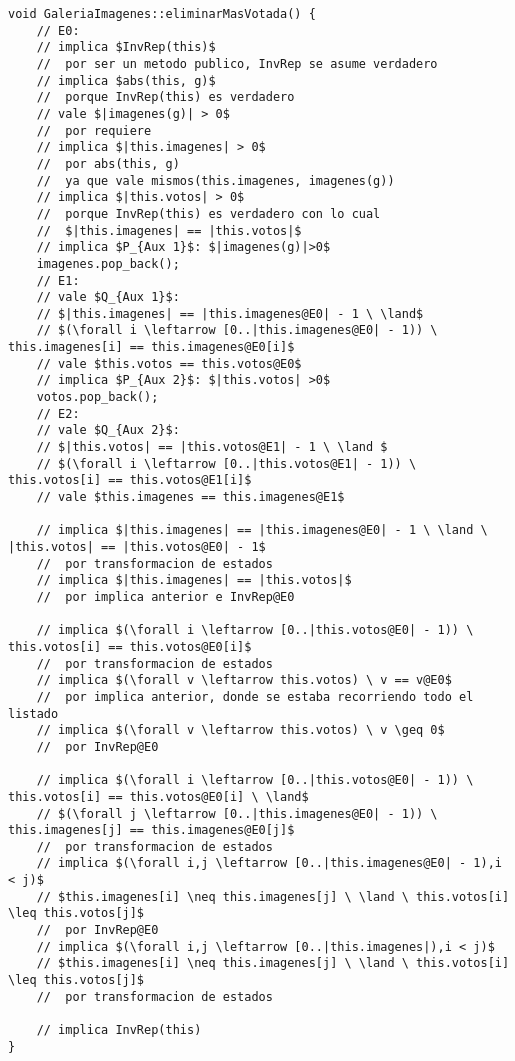 \documentclass[10pt,a4paper,spanish]{article}
\begin{document}
\begin{lstlisting}
void GaleriaImagenes::eliminarMasVotada() {
	// E0:
	// implica $InvRep(this)$
	// 	por ser un metodo publico, InvRep se asume verdadero
	// implica $abs(this, g)$
	// 	porque InvRep(this) es verdadero
	// vale $|imagenes(g)| > 0$
	// 	por requiere
	// implica $|this.imagenes| > 0$
	// 	por abs(this, g)
	//	ya que vale mismos(this.imagenes, imagenes(g))
	// implica $|this.votos| > 0$
	// 	porque InvRep(this) es verdadero con lo cual
	//	$|this.imagenes| == |this.votos|$
	// implica $P_{Aux 1}$: $|imagenes(g)|>0$
	imagenes.pop_back();
	// E1:
	// vale $Q_{Aux 1}$: 
	// $|this.imagenes| == |this.imagenes@E0| - 1 \ \land$
	// $(\forall i \leftarrow [0..|this.imagenes@E0| - 1)) \ this.imagenes[i] == this.imagenes@E0[i]$
	// vale $this.votos == this.votos@E0$
	// implica $P_{Aux 2}$: $|this.votos| >0$
	votos.pop_back();
	// E2:
	// vale $Q_{Aux 2}$: 
	// $|this.votos| == |this.votos@E1| - 1 \ \land $ 
	// $(\forall i \leftarrow [0..|this.votos@E1| - 1)) \ this.votos[i] == this.votos@E1[i]$
	// vale $this.imagenes == this.imagenes@E1$

	// implica $|this.imagenes| == |this.imagenes@E0| - 1 \ \land \ |this.votos| == |this.votos@E0| - 1$
	// 	por transformacion de estados
	// implica $|this.imagenes| == |this.votos|$
	//	por implica anterior e InvRep@E0

	// implica $(\forall i \leftarrow [0..|this.votos@E0| - 1)) \ this.votos[i] == this.votos@E0[i]$
	//	por transformacion de estados
	// implica $(\forall v \leftarrow this.votos) \ v == v@E0$
	//	por implica anterior, donde se estaba recorriendo todo el listado
	// implica $(\forall v \leftarrow this.votos) \ v \geq 0$
	//	por InvRep@E0

	// implica $(\forall i \leftarrow [0..|this.votos@E0| - 1)) \ this.votos[i] == this.votos@E0[i] \ \land$
	// $(\forall j \leftarrow [0..|this.imagenes@E0| - 1)) \ this.imagenes[j] == this.imagenes@E0[j]$
	// 	por transformacion de estados
	// implica $(\forall i,j \leftarrow [0..|this.imagenes@E0| - 1),i < j)$
	// $this.imagenes[i] \neq this.imagenes[j] \ \land \ this.votos[i] \leq this.votos[j]$
	//	por InvRep@E0
	// implica $(\forall i,j \leftarrow [0..|this.imagenes|),i < j)$
	// $this.imagenes[i] \neq this.imagenes[j] \ \land \ this.votos[i] \leq this.votos[j]$
	//	por transformacion de estados

	// implica InvRep(this)
}

\end{lstlisting}
\end{document}

